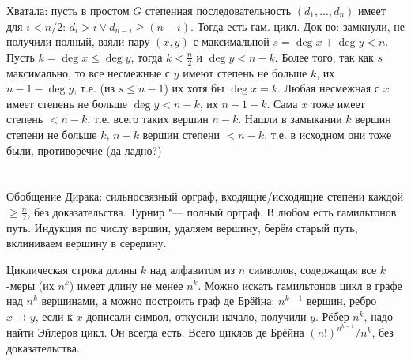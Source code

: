 Хватала: пусть в простом $G$ степенная последовательность $(d_1, \dots, d_n)$ имеет для $i<n/2$:
$d_i>i\lor d_{n-i}\ge(n-i)$.
Тогда есть гам. цикл.
Док-во: замкнули, не получили полный, взяли пару $(x, y)$ с максимальной $s=\deg x + \deg y < n$.
Пусть $k=\deg x \le \deg y$, тогда $k < \frac{n}{2}$ и $\deg y < n-k$.
Более того, так как $s$ максимально, то все несмежные с $y$ имеют степень не больше $k$,
их $n-1-\deg y$, т.е. (из $s \le n-1$) их хотя бы $\deg x = k$.
Любая несмежная с $x$ имеет степень не больше $\deg y < n-k$,
их $n-1-k$.
Сама $x$ тоже имеет степень $< n-k$, т.е. всего таких вершин $n-k$.
Нашли в замыкании $k$ вершин степени не больше $k$, $n-k$ вершин степени $<n-k$,
т.е. в исходном они тоже были, противоречие (\TODO да ладно?)

\section{} %
Обобщение Дирака: сильносвязный орграф, входящие/исходящие степени каждой $\ge \frac{n}{2}$,
без доказательства.
Турнир "--- полный орграф.
В любом есть гамильтонов путь.
Индукция по числу вершин, удаляем вершину, берём старый путь, вклиниваем вершину в середину.

Циклическая строка длины $k$ над алфавитом из $n$ символов, содержащая все
$k$-меры (их $n^k$) имеет длину не менее $n^k$.
Можно искать гамильтонов цикл в графе над $n^k$ вершинами,
а можно построить граф де Брёйна: $n^{k-1}$ вершин, ребро $x \to y$,
если к $x$ дописали символ, откусили начало, получили $y$.
Рёбер $n^k$, надо найти Эйлеров цикл.
Он всегда есть.
Всего циклов де Брёйна $(n!)^{n^{k-1}}/n^k$, без доказательства.

\section{} %
